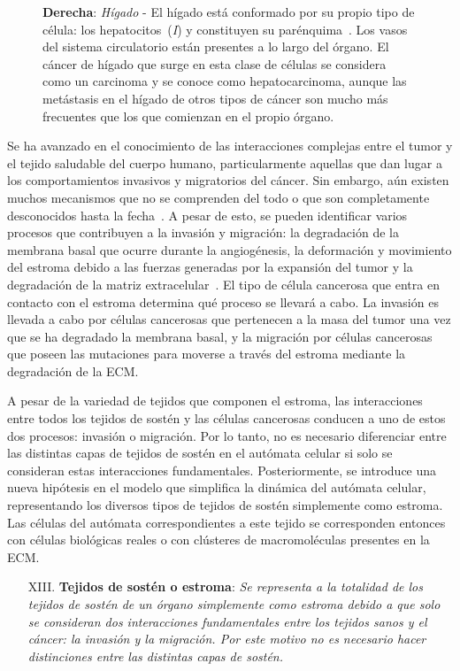 \begin{figure}[!ht]
{\textbf{Derecha}: \textit{H\'igado} - El h\'igado est\'a conformado por su propio tipo de c\'elula: los hepatocitos~(\emph{I}) y constituyen su par\'enquima~\cite{liver}. Los vasos del sistema circulatorio est\'an presentes a lo largo del \'organo. El c\'ancer de h\'igado que surge en esta clase de c\'elulas se considera como un carcinoma y se conoce como hepatocarcinoma, aunque las met\'astasis en el h\'igado de otros tipos de c\'ancer son mucho m\'as frecuentes que los que comienzan en el propio \'organo.}
\label{fig-structure}
\end{figure}

Se ha avanzado en el conocimiento de las interacciones complejas entre el tumor y el tejido saludable del cuerpo humano, particularmente aquellas que dan lugar a los comportamientos invasivos y migratorios del cáncer. Sin embargo, aún existen muchos mecanismos que no se comprenden del todo o que son completamente desconocidos hasta la fecha~\cite{kansal3}. A pesar de esto, se pueden identificar varios procesos que contribuyen a la invasión y migración: la degradación de la membrana basal que ocurre durante la angiogénesis, la deformación y movimiento del estroma debido a las fuerzas generadas por la expansión del tumor y la degradación de la matriz extracelular~\cite{kansal3}. El tipo de célula cancerosa que entra en contacto con el estroma determina qué proceso se llevará a cabo. La invasión es llevada a cabo por células cancerosas que pertenecen a la masa del tumor una vez que se ha degradado la membrana basal, y la migración por células cancerosas que poseen las mutaciones para moverse a través del estroma mediante la degradación de la ECM.

A pesar de la variedad de tejidos que componen el estroma, las interacciones entre todos los tejidos de sostén y las células cancerosas conducen a uno de estos dos procesos: invasión o migración. Por lo tanto, no es necesario diferenciar entre las distintas capas de tejidos de sostén en el autómata celular si solo se consideran estas interacciones fundamentales. Posteriormente, se introduce una nueva hipótesis en el modelo que simplifica la dinámica del autómata celular, representando los diversos tipos de tejidos de sostén simplemente como estroma. Las células del autómata correspondientes a este tejido se corresponden entonces con células biológicas reales o con clústeres de macromoléculas presentes en la ECM.

\begin{itemize}
\item [{XIII.}] \textbf{Tejidos de sost\'en o estroma}: \emph{Se representa a la totalidad de los tejidos de sost\'en de un \'organo simplemente como estroma debido a que solo se consideran dos interacciones fundamentales entre los tejidos sanos y el c\'ancer: la invasi\'on y la migraci\'on. Por este motivo no es necesario hacer distinciones entre las distintas capas de sost\'en.} \label{XIII}
\end{itemize}

